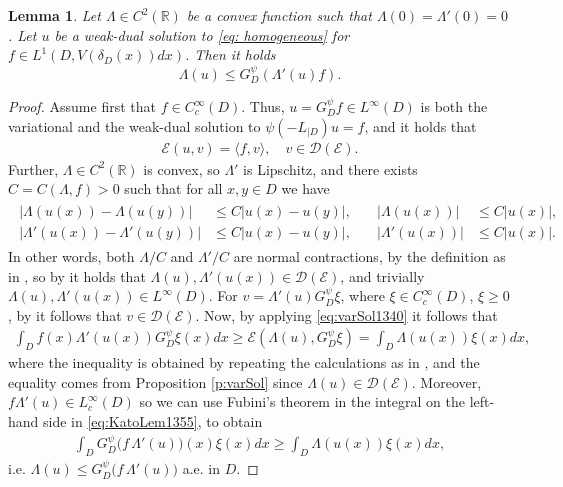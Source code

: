 \documentclass[12pt,a4paper,onecolumn]{article}
\newtheorem{lem}[thm]{Lemma}
\theoremstyle{definition}
\newcommand{\R}{\mathbb{R}}
\newcommand{\1}{\mathbf 1}
\newcommand{\de}{\delta_D}
\newcommand{\la}{\langle}
\newcommand{\ra}{\rangle}
\newcommand{\LLL}{L^1(D,V(\de(x))dx)}
\newcommand{\EE}{\mathcal{E}}
\newcommand{\DD}{\mathcal{D}}
\newcommand{\Lo}{\psi(-L_{|D})}
\newcommand{\GDP}{G_D^\psi}
\numberwithin{equation}{section}
\begin{document}
 
 \begin{lem}\label{l:Kato}
     Let $\Lambda\in C^2(\R)$ be a convex function such that $\Lambda(0)=\Lambda'(0)=0$. Let $u$ be a weak-dual solution to \eqref{eq: homogeneous}
     for $f\in \LLL$. Then it holds
     $$\Lambda(u)\le \GDP\left(\Lambda'(u)f\right).$$
 \end{lem}
 \begin{proof}
     Assume first that $f\in C_c^\infty(D)$. Thus, $u=\GDP f\in L^\infty(D)$ is both the variational and the weak-dual solution to $\Lo u=f$, and it holds that
     \begin{align}\label{eq:varSol1340}
         \EE(u,v)=\la f,v\ra,\quad v\in \DD(\EE).
     \end{align}
     Further, $\Lambda\in C^2(\R)$ is convex, so $\Lambda'$ is Lipschitz, and there exists $C=C(\Lambda,f)>0$ such that for all $x,y\in D$ we have
     \begin{align*}
     	\begin{split}
     	    |\Lambda(u(x))-\Lambda(u(y))|&\le C |u(x)-u(y)|,\\
        |\Lambda'(u(x))-\Lambda'(u(y))|&\le C |u(x)-u(y)|,
     	\end{split}\quad
        \begin{split}
            |\Lambda(u(x))|&\le C |u(x)|,\\
         |\Lambda'(u(x))|&\le C |u(x)|.
        \end{split}
     \end{align*}     
     In other words, both $\Lambda/C$ and $\Lambda'/C$ are normal contractions, by the definition as in \cite[Eq. ($\EE$.4)'' on p.~5]{FOT}, so by \cite[Theorem 1.4.1(e)]{FOT} it holds that  $\Lambda(u),\Lambda'(u(x))\in \DD(\EE)$, and trivially $\Lambda(u),\Lambda'(u(x))\in L^\infty(D)$.
     For $v=\Lambda'(u)\GDP \xi$, where $\xi \in C_c^\infty(D)$, $\xi\ge0$, by  \cite[Theorem 1.4.2(ii)]{FOT} it follows that $v\in\DD(\EE)$. Now, by applying \eqref{eq:varSol1340} it follows that
     \begin{align}\label{eq:KatoLem1355}
         \int_D f(x) \Lambda'(u(x)) \GDP \xi(x) dx\ge \EE(\Lambda(u),\GDP\xi)=\int_D \Lambda(u(x))\xi(x)dx,
     \end{align}
     where the inequality is obtained by repeating the calculations as in \cite[Eqs. (5.4) - (5.6)]{HuynhNguyen2022}, and the equality comes from Proposition \ref{p:varSol} since $\Lambda(u)\in \DD(\EE)$. Moreover, $f \Lambda'(u)\in L_c^\infty(D)$ so we can use Fubini's theorem in the integral on the left-hand side in \eqref{eq:KatoLem1355}, to obtain
     \begin{align*}
         \int_D \GDP\big(f\, \Lambda'(u)\big)(x)  \xi(x) dx\ge \int_D \Lambda(u(x))\xi(x)dx,
     \end{align*}
     i.e. $\Lambda(u)\le \GDP\big(f\, \Lambda'(u)\big)$ a.e. in $D$.
     

\end{proof}
\end{document}
